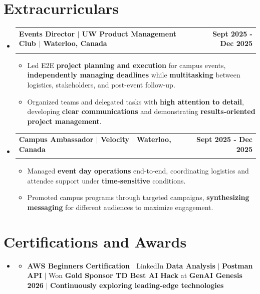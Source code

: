 \documentclass[letterpaper,10pt]{article}
\makeatletter
\newcommand{\resumeItem}[1]{
  \item\small{
    {#1 \vspace{-1pt}}
  }
}
\newcommand{\resumeSubheading}[4]{
  \vspace{-1pt}\item
    \begin{tabular*}{1.0\textwidth}[t]{l@{\extracolsep{\fill}}r}
      \textbf{#1} & \textbf{\small #2} \\
      \textit{\small#3} & \textit{\small #4} \\[-2pt]
    \end{tabular*}\vspace{-7pt}
}
\newcommand{\resumeSubHeadingListStart}{\begin{itemize}[leftmargin=0.0in, label={}]}
\newcommand{\resumeSubHeadingListEnd}{\end{itemize}}
\newcommand{\resumeItemListStart}{\begin{itemize}[leftmargin=0.15in]}
\newcommand{\resumeItemListEnd}{\end{itemize}\vspace{-4pt}}
\makeatother
\begin{document}
\section{Extracurriculars}
  \resumeSubHeadingListStart
    \resumeSubheading
      {Events Director $|$ UW Product Management Club $|$ Waterloo, Canada}{Sept 2025 - Dec 2025}
      {}{}
      \vspace{-13pt}
      \resumeItemListStart
      \vspace{-2pt}
        \resumeItem{Led E2E \textbf{project planning and execution} for campus events, \textbf{independently managing deadlines} while \textbf{multitasking} between logistics, stakeholders, and post-event follow-up.}
        \vspace{-2pt}
        \resumeItem{Organized teams and delegated tasks with \textbf{high attention to detail}, developing \textbf{clear communications} and demonstrating \textbf{results-oriented project management}.}
      \resumeItemListEnd
      \vspace{-5pt}
    \resumeSubheading
      {Campus Ambassador $|$ Velocity $|$ Waterloo, Canada}{Sept 2025 - Dec 2025}
      {}{}
      \vspace{-13pt}
      \resumeItemListStart
      \vspace{-2pt}
        \resumeItem{Managed \textbf{event day operations} end-to-end, coordinating logistics and attendee support under \textbf{time-sensitive} conditions.}
        \vspace{-2pt}
        \resumeItem{Promoted campus programs through targeted campaigns, \textbf{synthesizing messaging} for different audiences to maximize engagement.}
      \resumeItemListEnd
      \vspace{-2pt}
  \resumeSubHeadingListEnd
\vspace{-13pt}
\section{Certifications and Awards}
    \resumeSubHeadingListStart
      \item[]
          \resumeItemListStart
            \resumeItem{\textbf{AWS Beginners Certification} $|$ LinkedIn \textbf{Data Analysis} $|$ \textbf{Postman API} $|$ Won \textbf{Gold Sponsor TD Best AI Hack} at \textbf{GenAI Genesis 2026} $|$ \textbf{Continuously exploring leading-edge technologies}}
          \resumeItemListEnd
          \vspace{-8pt}
        
   \resumeSubHeadingListEnd
\end{document}
